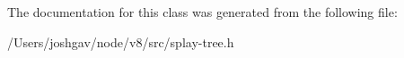The documentation for this class was generated from the following file\+:\begin{DoxyCompactItemize}
\item 
/\+Users/joshgav/node/v8/src/splay-\/tree.\+h\end{DoxyCompactItemize}
